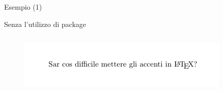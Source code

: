 \begin{frame}[fragile]{Esempio (1)}

\begin{esempio}{Senza l'utilizzo di package}
	\begin{code}
	    \inputminted[linenos] {latex}{res/examples/withoututf8.tex}
	\end{code}

\pause
	
	\begin{figure}
        \centering
        \includegraphics[scale=0.9]{res/images/no_utf8}
    \end{figure}
    \vspace{1mm}
\end{esempio}

\end{frame}
